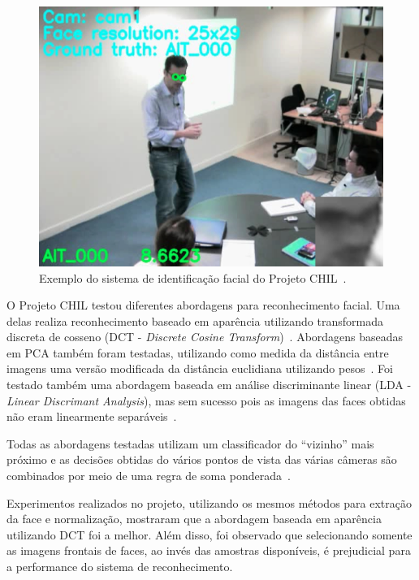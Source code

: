 	\begin{figure}[hbt]
		\begin{center}
			\includegraphics[scale=0.4]{figuras/3.TrabalhosCorrelatos/chil.png}
		\end{center}
		\caption{Exemplo do sistema de identificação facial do Projeto CHIL~\cite{chil}.}
		\label{chil}
	\end{figure}


O Projeto CHIL testou diferentes abordagens para reconhecimento facial. Uma delas realiza reconhecimento baseado em aparência utilizando transformada discreta de cosseno (DCT - \textit{Discrete Cosine Transform})~\cite{chilref6, chilref7}. Abordagens baseadas em PCA também foram testadas, utilizando como medida da distância entre imagens uma versão modificada da distância euclidiana utilizando pesos~\cite{chilref8, chilref9}.  Foi testado também uma abordagem baseada em análise discriminante linear (LDA - \textit{Linear Discrimant Analysis}), mas sem sucesso pois as imagens das faces obtidas não eram linearmente separáveis~\cite{chilref8, chilref9}. 

Todas as abordagens testadas utilizam um classificador do ``vizinho'' mais próximo e as decisões obtidas do vários pontos de vista das várias câmeras são combinados por meio de uma regra de soma ponderada~\cite{chilref8, chilref9}. 

Experimentos realizados no projeto, utilizando os mesmos métodos para extração da face e normalização, mostraram que a abordagem baseada em aparência utilizando DCT foi a melhor. Além disso, foi observado que selecionando somente as imagens frontais de faces, ao invés das amostras disponíveis, é prejudicial para a performance do sistema de reconhecimento. 

